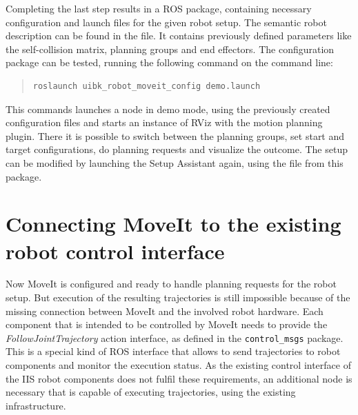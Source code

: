 Completing the last step results in a ROS package, containing necessary configuration and launch files for the given robot setup. The semantic robot description can be found in the  file. It contains previously defined parameters like the self-collision matrix, planning groups and end effectors. The configuration package can be tested, running the following command on the command line:
\begin{quote}
\begin{verbatim}
roslaunch uibk_robot_moveit_config demo.launch
\end{verbatim}
\end{quote}
This commands launches a  node in demo mode, using the previously created configuration files and starts an instance of RViz with the motion planning plugin. There it is possible to switch between the planning groups, set start and target configurations, do planning requests and visualize the outcome. The setup can be modified by launching the Setup Assistant again, using the  file from this package.

\section{Connecting MoveIt to the existing robot control interface}
\label{sec:hardware_adapter}

Now MoveIt is configured and ready to handle planning requests for the robot setup. But execution of the resulting trajectories is still impossible because of the missing connection between MoveIt and the involved robot hardware. Each component that is intended to be controlled by MoveIt needs to provide the \emph{FollowJointTrajectory} action interface, as defined in the \texttt{control\_msgs} package. This is a special kind of ROS interface that allows to send trajectories to robot components and monitor the execution status. As the existing control interface of the IIS robot components does not fulfil these requirements, an additional node is necessary that is capable of executing trajectories, using the existing infrastructure.\\

